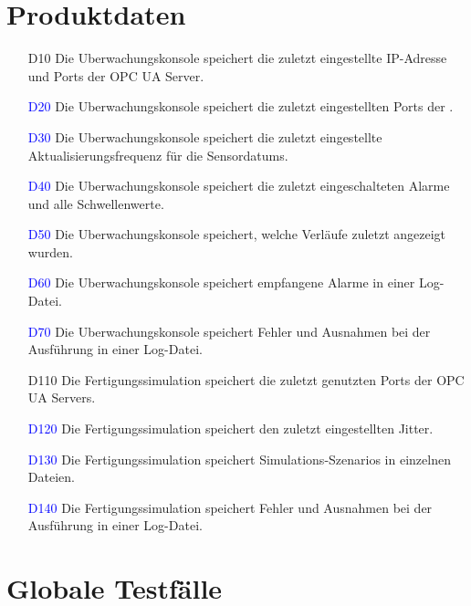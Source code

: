 \documentclass[parskip=full]{scrartcl}
\begin{document}
\section{Produktdaten}
\begin{enumerate}
  \item[D10] Die \gls{Uberwachungskonsole} speichert die zuletzt eingestellte IP-Adresse und Ports der \gls{OPC UA Server}.
  \item[\textcolor{blue}{D20}] Die \gls{Uberwachungskonsole} speichert die zuletzt eingestellten Ports der .
  \item[\textcolor{blue}{D30}] Die \gls{Uberwachungskonsole} speichert die zuletzt eingestellte Aktualisierungsfrequenz für die \glspl{Sensordatum}.
  \item[\textcolor{blue}{D40}] Die \gls{Uberwachungskonsole} speichert die zuletzt eingeschalteten Alarme und alle Schwellenwerte.
  \item[\textcolor{blue}{D50}] Die \gls{Uberwachungskonsole} speichert, welche Verläufe zuletzt angezeigt wurden.
  \item[\textcolor{blue}{D60}] Die \gls{Uberwachungskonsole} speichert empfangene Alarme in einer Log-Datei.
  \item[\textcolor{blue}{D70}] Die \gls{Uberwachungskonsole} speichert Fehler und Ausnahmen bei der Ausführung in einer Log-Datei.
  \item[D110] Die \gls{Fertigungssimulation} speichert die zuletzt genutzten Ports der \glspl{OPC UA Server}.
  \item[\textcolor{blue}{D120}] Die \gls{Fertigungssimulation} speichert den zuletzt eingestellten \gls{Jitter}.
  \item[\textcolor{blue}{D130}] Die \gls{Fertigungssimulation} speichert \glspl{Simulations-Szenario} in einzelnen Dateien.
  \item[\textcolor{blue}{D140}] Die \gls{Fertigungssimulation} speichert Fehler und Ausnahmen bei der Ausführung in einer Log-Datei.
\end{enumerate}

\pagebreak
\section{Globale Testfälle}
\end{document}

